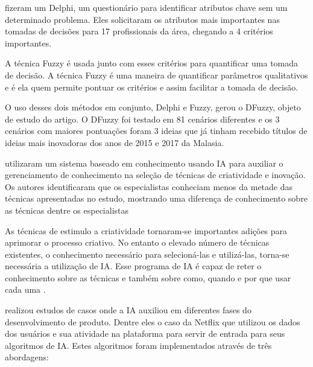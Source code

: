  fizeram um Delphi, um questionário para identificar atributos chave sem um determinado problema. Eles solicitaram os atributos mais importantes nas tomadas de decisões para 17 profissionais da área, chegando a 4 critérios importantes. 

A técnica Fuzzy é usada junto com esses critérios para quantificar uma tomada de decisão. A técnica Fuzzy é uma maneira de quantificar parâmetros qualitativos e é ela quem permite pontuar os critérios e assim facilitar a tomada de decisão.

O uso desses dois métodos em conjunto, Delphi e Fuzzy, gerou o DFuzzy, objeto de estudo do artigo. O DFuzzy foi testado em 81 cenários diferentes e os 3 cenários com maiores pontuações foram 3 ideias que já tinham recebido títulos de ideias mais inovadoras dos anos de 2015 e 2017 da Malasia.


 utilizaram um sistema baseado em conhecimento usando IA para auxiliar o gerenciamento de conhecimento na seleção de técnicas de criatividade e inovação. Os autores identificaram que os especialistas conheciam menos da metade das técnicas apresentadas no estudo, mostrando uma diferença de conhecimento sobre as técnicas dentre os especialistas 

As técnicas de estimulo a criatividade tornaram-se importantes adições para aprimorar o processo criativo. No entanto o elevado número de técnicas existentes, o conhecimento necessário para selecioná-las e utilizá-las, torna-se necessária a utilização de IA. Esse programa de IA é capaz de reter o conhecimento sobre as técnicas e também sobre como, quando e por que usar cada uma \cite{de2020artificial}.


 realizou estudos de casos onde a IA auxiliou em diferentes fases do desenvolvimento de produto. Dentre eles o caso da Netflix que utilizou os dados dos usuários e sua atividade na plataforma para servir de entrada para seus algoritmos de IA. Estes algoritmos foram implementados através de três abordagens: 

